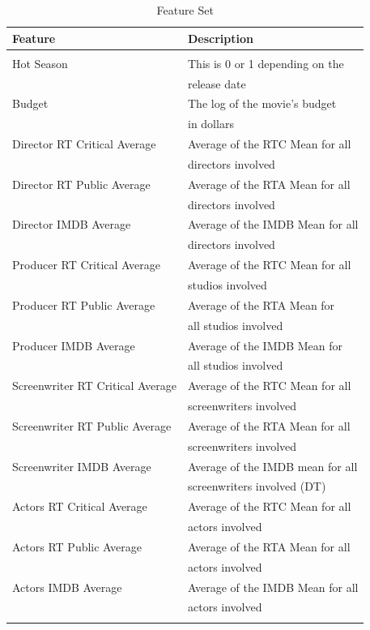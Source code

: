\documentclass[conference]{IEEEtran}
\begin{document}
\begin{table}[h]
\caption{Feature Set}
\label{table:datadict}
\begin{tabular}{l|l}
Feature          & Description \\
\hline
\\
Hot Season & This is 0 or 1 depending on the\\* & release date\\ 
Budget & The log of the movie's budget \\* & in dollars \\
Director RT Critical Average & Average of the RTC Mean for all\\* & directors involved\\
Director RT Public Average & Average of the RTA Mean for all\\* & directors involved\\
Director IMDB Average & Average of the IMDB Mean for all\\* & directors involved\\
Producer RT Critical Average & Average of the RTC Mean for all\\* & studios involved\\
Producer RT Public Average & Average of the RTA Mean for \\* & all studios involved\\
Producer IMDB Average &  Average of the IMDB Mean for \\* & all studios involved\\
Screenwriter RT Critical Average & Average of the RTC Mean for all \\* & screenwriters involved\\
Screenwriter RT Public Average & Average of the RTA Mean for all \\* & screenwriters involved\\
Screenwriter IMDB Average & Average of the IMDB mean for all \\* & screenwriters involved (DT)\\ 
Actors RT Critical Average & Average of the RTC Mean for all \\* & actors involved\\
Actors RT Public Average  & Average of the RTA Mean for all\\* & actors involved\\
Actors IMDB Average &  Average of the IMDB Mean for all\\* & actors involved\\     &\\ 
\end{tabular}
\end{table}
\end{document}
